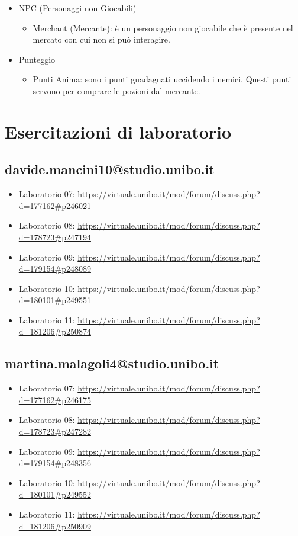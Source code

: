 \documentclass[a4paper,12pt]{report}
\begin{document}
\begin{itemize}
\begin{itemize}
    \end{itemize}
    \item NPC (Personaggi non Giocabili)
    \begin{itemize}
        \item Merchant (Mercante): è un personaggio non giocabile che è presente nel mercato con cui non si può interagire.
          \end{itemize}
        \item Punteggio
        \begin{itemize}
        \item Punti Anima: sono i punti guadagnati uccidendo i nemici. Questi punti servono per comprare le pozioni dal mercante.
    \end{itemize}
\end{itemize}

\chapter{Esercitazioni di laboratorio}

\section{davide.mancini10@studio.unibo.it}

\begin{itemize}
	\item Laboratorio 07: \url{https://virtuale.unibo.it/mod/forum/discuss.php?d=177162#p246021}
	\item Laboratorio 08: \url{https://virtuale.unibo.it/mod/forum/discuss.php?d=178723#p247194}
	\item Laboratorio 09: \url{https://virtuale.unibo.it/mod/forum/discuss.php?d=179154#p248089}
	\item Laboratorio 10: \url{https://virtuale.unibo.it/mod/forum/discuss.php?d=180101#p249551}
	\item Laboratorio 11: \url{https://virtuale.unibo.it/mod/forum/discuss.php?d=181206#p250874}
\end{itemize}

\section{martina.malagoli4@studio.unibo.it}

\begin{itemize}
	\item Laboratorio 07: \url{https://virtuale.unibo.it/mod/forum/discuss.php?d=177162#p246175}
	\item Laboratorio 08: \url{https://virtuale.unibo.it/mod/forum/discuss.php?d=178723#p247282}
	\item Laboratorio 09: \url{https://virtuale.unibo.it/mod/forum/discuss.php?d=179154#p248356}
	\item Laboratorio 10: \url{https://virtuale.unibo.it/mod/forum/discuss.php?d=180101#p249552}
	\item Laboratorio 11: \url{https://virtuale.unibo.it/mod/forum/discuss.php?d=181206#p250909}
\end{itemize}
\end{document}
